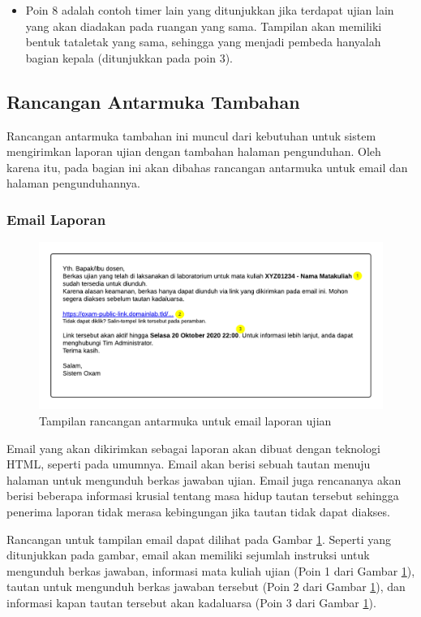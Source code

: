 \begin{itemize}
        \item Poin 8 adalah contoh timer lain yang ditunjukkan jika terdapat
            ujian lain yang akan diadakan pada ruangan yang sama. Tampilan akan
            memiliki bentuk tataletak yang sama, sehingga yang menjadi pembeda
            hanyalah bagian kepala (ditunjukkan pada poin 3).
    \end{itemize}
    
    
\subsection{Rancangan Antarmuka Tambahan}
    Rancangan antarmuka tambahan ini muncul dari kebutuhan untuk sistem
    mengirimkan laporan ujian dengan tambahan halaman pengunduhan. Oleh karena
    itu, pada bagian ini akan dibahas rancangan antarmuka untuk email dan
    halaman pengunduhannya.
    
\subsubsection{Email Laporan}
    \begin{figure}
        \centering
        \includegraphics[width=0.7\paperwidth]{Gambar/mockups/Mockup--Tambahan.pdf}
        \caption{Tampilan rancangan antarmuka untuk email laporan ujian}
        \label{fig:mockup_addition_email}
    \end{figure}
    Email yang akan dikirimkan sebagai laporan akan dibuat dengan teknologi
    HTML, seperti pada umumnya. Email akan berisi sebuah tautan menuju halaman
    untuk mengunduh berkas jawaban ujian. Email juga rencananya akan berisi
    beberapa informasi krusial tentang masa hidup tautan tersebut sehingga
    penerima laporan tidak merasa kebingungan jika tautan tidak dapat diakses.
    
    Rancangan untuk tampilan email dapat dilihat pada Gambar
    \ref{fig:mockup_addition_email}. Seperti yang ditunjukkan pada gambar, email
    akan memiliki sejumlah instruksi untuk mengunduh berkas jawaban, informasi
    mata kuliah ujian (Poin 1 dari Gambar \ref{fig:mockup_addition_email}),
    tautan untuk mengunduh berkas jawaban tersebut (Poin 2 dari Gambar
    \ref{fig:mockup_addition_email}), dan informasi kapan tautan tersebut akan
    kadaluarsa (Poin 3 dari Gambar \ref{fig:mockup_addition_email}).
    
